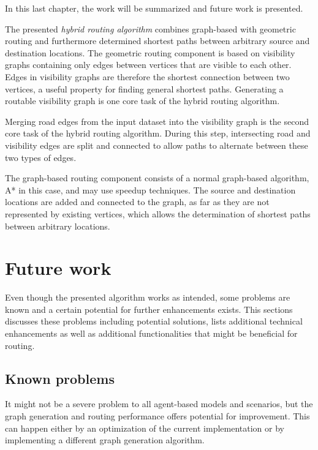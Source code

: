 
In this last chapter, the work will be summarized and future work is presented.

The presented \emph{hybrid routing algorithm} combines graph-based with geometric routing and furthermore determined shortest paths between arbitrary source and destination locations.
The geometric routing component is based on visibility graphs containing only edges between vertices that are visible to each other.
Edges in visibility graphs are therefore the shortest connection between two vertices, a useful property for finding general shortest paths.
Generating a routable visibility graph is one core task of the hybrid routing algorithm.

Merging road edges from the input dataset into the visibility graph is the second core task of the hybrid routing algorithm.
During this step, intersecting road and visibility edges are split and connected to allow paths to alternate between these two types of edges.

The graph-based routing component consists of a normal graph-based algorithm, A* in this case, and may use speedup techniques.
The source and destination locations are added and connected to the graph, as far as they are not represented by existing vertices, which allows the determination of shortest paths between arbitrary locations.
	
\section{Future work}
\label{sec:future-work}

	Even though the presented algorithm works as intended, some problems are known and a certain potential for further enhancements exists.
	This sections discusses these problems including potential solutions, lists additional technical enhancements as well as additional functionalities that might be beneficial for routing.

	\subsection{Known problems}
		It might not be a severe problem to all agent-based models and scenarios, but the graph generation and routing performance offers potential for improvement.
		This can happen either by an optimization of the current implementation or by implementing a different graph generation algorithm.
		
